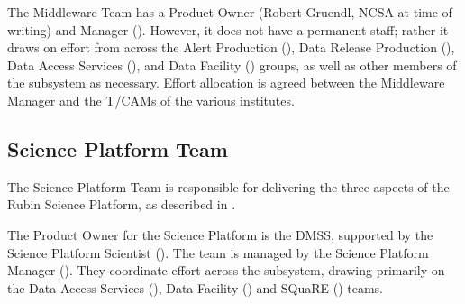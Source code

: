 The Middleware Team has a Product Owner (Robert Gruendl, NCSA at time of writing) and Manager ().
However, it does not have a permanent staff; rather it draws on effort from across the Alert Production (), Data Release Production (), Data Access Services (), and Data Facility () groups, as well as other members of the subsystem as necessary.
Effort allocation is agreed between the Middleware Manager and the T/CAMs of the various institutes.

\subsection{Science Platform Team \label{sec:sciplat}}

The Science Platform Team is responsible for delivering the three aspects of the Rubin Science Platform, as described in .

The Product Owner for the Science Platform is the \gls{DMSS}, supported by the Science Platform Scientist ().
The team is managed by the Science Platform Manager ().
They coordinate effort across the subsystem, drawing primarily on the Data Access Services (), Data Facility () and SQuaRE () teams.
